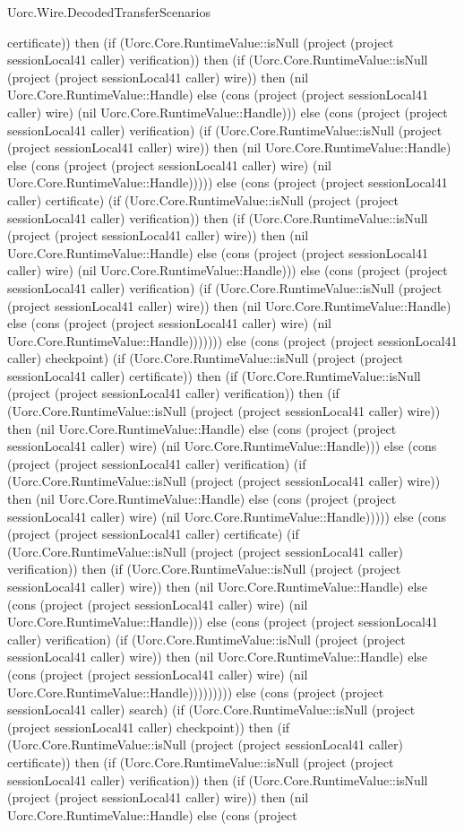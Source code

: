 \begin{lexlean}{Uorc.Wire.DecodedTransferScenarios}
\begin{semanticmodule}
{certificate)) then (if (Uorc.Core.RuntimeValue::isNull (project (project sessionLocal41 caller) verification)) then (if (Uorc.Core.RuntimeValue::isNull (project (project sessionLocal41 caller) wire)) then (nil Uorc.Core.RuntimeValue::Handle) else (cons (project (project sessionLocal41 caller) wire) (nil Uorc.Core.RuntimeValue::Handle))) else (cons (project (project sessionLocal41 caller) verification) (if (Uorc.Core.RuntimeValue::isNull (project (project sessionLocal41 caller) wire)) then (nil Uorc.Core.RuntimeValue::Handle) else (cons (project (project sessionLocal41 caller) wire) (nil Uorc.Core.RuntimeValue::Handle))))) else (cons (project (project sessionLocal41 caller) certificate) (if (Uorc.Core.RuntimeValue::isNull (project (project sessionLocal41 caller) verification)) then (if (Uorc.Core.RuntimeValue::isNull (project (project sessionLocal41 caller) wire)) then (nil Uorc.Core.RuntimeValue::Handle) else (cons (project (project sessionLocal41 caller) wire) (nil Uorc.Core.RuntimeValue::Handle))) else (cons (project (project sessionLocal41 caller) verification) (if (Uorc.Core.RuntimeValue::isNull (project (project sessionLocal41 caller) wire)) then (nil Uorc.Core.RuntimeValue::Handle) else (cons (project (project sessionLocal41 caller) wire) (nil Uorc.Core.RuntimeValue::Handle))))))) else (cons (project (project sessionLocal41 caller) checkpoint) (if (Uorc.Core.RuntimeValue::isNull (project (project sessionLocal41 caller) certificate)) then (if (Uorc.Core.RuntimeValue::isNull (project (project sessionLocal41 caller) verification)) then (if (Uorc.Core.RuntimeValue::isNull (project (project sessionLocal41 caller) wire)) then (nil Uorc.Core.RuntimeValue::Handle) else (cons (project (project sessionLocal41 caller) wire) (nil Uorc.Core.RuntimeValue::Handle))) else (cons (project (project sessionLocal41 caller) verification) (if (Uorc.Core.RuntimeValue::isNull (project (project sessionLocal41 caller) wire)) then (nil Uorc.Core.RuntimeValue::Handle) else (cons (project (project sessionLocal41 caller) wire) (nil Uorc.Core.RuntimeValue::Handle))))) else (cons (project (project sessionLocal41 caller) certificate) (if (Uorc.Core.RuntimeValue::isNull (project (project sessionLocal41 caller) verification)) then (if (Uorc.Core.RuntimeValue::isNull (project (project sessionLocal41 caller) wire)) then (nil Uorc.Core.RuntimeValue::Handle) else (cons (project (project sessionLocal41 caller) wire) (nil Uorc.Core.RuntimeValue::Handle))) else (cons (project (project sessionLocal41 caller) verification) (if (Uorc.Core.RuntimeValue::isNull (project (project sessionLocal41 caller) wire)) then (nil Uorc.Core.RuntimeValue::Handle) else (cons (project (project sessionLocal41 caller) wire) (nil Uorc.Core.RuntimeValue::Handle))))))))) else (cons (project (project sessionLocal41 caller) search) (if (Uorc.Core.RuntimeValue::isNull (project (project sessionLocal41 caller) checkpoint)) then (if (Uorc.Core.RuntimeValue::isNull (project (project sessionLocal41 caller) certificate)) then (if (Uorc.Core.RuntimeValue::isNull (project (project sessionLocal41 caller) verification)) then (if (Uorc.Core.RuntimeValue::isNull (project (project sessionLocal41 caller) wire)) then (nil Uorc.Core.RuntimeValue::Handle) else (cons (project }
\end{semanticmodule}
\end{lexlean}
